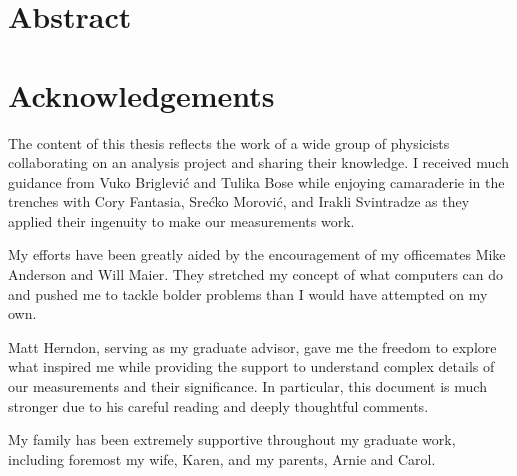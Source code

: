 

\frontmatter

\thetitlepage
\cleardoublepage
\setcounter{page}{1}

\section{Abstract}
\uwabstract
\cleardoublepage

\section{Acknowledgements}
The content of this thesis reflects the work of a wide group of physicists collaborating on an analysis project and sharing their knowledge.  I received much guidance from Vuko Briglevi\'{c} and Tulika Bose while enjoying camaraderie in the trenches with Cory Fantasia, Sre\'{c}ko Morovi\'{c}, and Irakli Svintradze as they applied their ingenuity to make our measurements work.

My efforts have been greatly aided by the encouragement of my officemates Mike Anderson and Will Maier.  They stretched my concept of what computers can do and pushed me to tackle bolder problems than I would have attempted on my own.

Matt Herndon, serving as my graduate advisor, gave me the freedom to explore what inspired me while providing the support to understand complex details of our measurements and their significance.  In particular, this document is much stronger due to his careful reading and deeply thoughtful comments.

My family has been extremely supportive throughout my graduate work, including foremost my wife, Karen, and my parents, Arnie and Carol.

\clearpage

\tableofcontents\clearpage
\listoffigures\clearpage
\listoftables\clearpage

\mainmatter
















